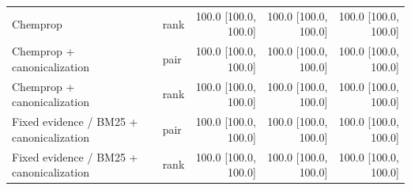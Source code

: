 \begin{longtable}{p{.26\linewidth}lrrr}
Chemprop & rank & 100.0 [100.0, 100.0] & 100.0 [100.0, 100.0] & 100.0 [100.0, 100.0] \\
Chemprop + canonicalization & pair & 100.0 [100.0, 100.0] & 100.0 [100.0, 100.0] & 100.0 [100.0, 100.0] \\
Chemprop + canonicalization & rank & 100.0 [100.0, 100.0] & 100.0 [100.0, 100.0] & 100.0 [100.0, 100.0] \\
Fixed evidence / BM25 + canonicalization & pair & 100.0 [100.0, 100.0] & 100.0 [100.0, 100.0] & 100.0 [100.0, 100.0] \\
Fixed evidence / BM25 + canonicalization & rank & 100.0 [100.0, 100.0] & 100.0 [100.0, 100.0] & 100.0 [100.0, 100.0] \\
\bottomrule
\end{longtable}
\endgroup
